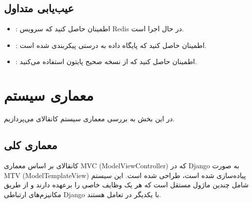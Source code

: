 \documentclass[letterpaper,10pt,english]{sphinxmanual}
\begin{document}
\subsection{عیب‌یابی متداول}
\label{\detokenize{installation/index:id6}}\begin{itemize}
\item {} 
\sphinxAtStartPar
{}: اطمینان حاصل کنید که سرویس Redis در حال اجرا است.

\item {} 
\sphinxAtStartPar
{}: اطمینان حاصل کنید که پایگاه داده به درستی پیکربندی شده است.

\item {} 
\sphinxAtStartPar
{}: اطمینان حاصل کنید که از نسخه صحیح پایتون استفاده می‌کنید.

\end{itemize}

\sphinxstepscope


\section{معماری سیستم}
\label{\detokenize{architecture/index:architecture}}\label{\detokenize{architecture/index:id1}}\label{\detokenize{architecture/index::doc}}
\sphinxAtStartPar
در این بخش به بررسی معماری سیستم کانقالای می‌پردازیم.


\subsection{معماری کلی}
\label{\detokenize{architecture/index:id2}}
\sphinxAtStartPar
کانقالای بر اساس معماری MVC (Model\sphinxhyphen{}View\sphinxhyphen{}Controller) که در Django به صورت MTV (Model\sphinxhyphen{}Template\sphinxhyphen{}View) پیاده‌سازی شده است، طراحی شده است. این سیستم شامل چندین ماژول مستقل است که هر یک وظایف خاصی را برعهده دارند و از طریق مکانیزم‌های ارتباطی Django با یکدیگر در تعامل هستند.
\end{document}
